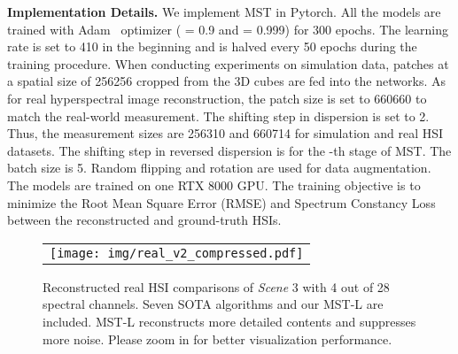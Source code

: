 \documentclass[10pt,twocolumn,letterpaper]{article}
\begin{document}
\noindent \textbf{Implementation Details.} We implement MST in Pytorch. All the models are trained with Adam~\cite{adam} optimizer ( = 0.9 and  = 0.999) for 300 epochs. The learning rate is set to 410 in the beginning and is halved every 50 epochs during the training procedure. When conducting experiments on simulation data, patches at a spatial size of 256256 cropped from the 3D cubes are fed into the networks. As for real hyperspectral image reconstruction, the patch size is set to 660660 to match the real-world measurement. The shifting step  in dispersion is set to 2. Thus, the measurement sizes are 256310 and 660714 for simulation and real HSI datasets. The shifting step in reversed dispersion is  for the -th stage of MST. The batch size is 5. Random flipping and rotation are used for data augmentation. The models are trained on one RTX 8000 GPU. The training objective is to minimize the Root Mean Square Error (RMSE) and Spectrum Constancy Loss~\cite{Zhao_2019_CVPR} between the reconstructed and ground-truth HSIs.
\begin{figure*}[t]
	\begin{center}
		\begin{tabular}[t]{c} \hspace{-2.7mm} \texttt{[image: img/real\_v2\_compressed.pdf]}
		\end{tabular}
	\end{center}
	\vspace*{-7mm}
	\caption{\small Reconstructed real HSI comparisons of  \emph{Scene} 3 with 4 out of 28 spectral channels. Seven SOTA algorithms and our MST-L are included. MST-L reconstructs more detailed contents and suppresses more noise. Please zoom in for better visualization performance. }
	\label{fig:real}
	\vspace{-5mm}
\end{figure*}

\vspace{-4.5mm}
\end{document}
